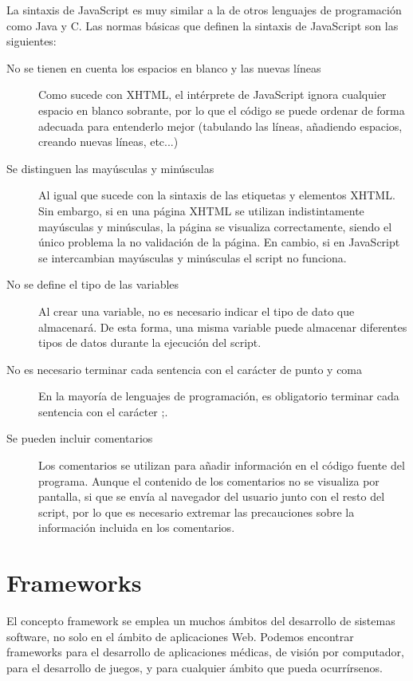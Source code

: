 La sintaxis de JavaScript es muy similar a la de otros lenguajes de programación como Java y C. Las normas básicas que definen la sintaxis de JavaScript son las siguientes:
\begin{description}
    \item[No se tienen en cuenta los espacios en blanco y las nuevas líneas] Como sucede con XHTML, el intérprete de JavaScript ignora cualquier espacio en blanco sobrante, por lo que el código se puede ordenar de forma adecuada para entenderlo mejor (tabulando las líneas, añadiendo espacios, creando nuevas líneas, etc...)
    
    \item[Se distinguen las mayúsculas y minúsculas] Al igual que sucede con la sintaxis de las etiquetas y elementos XHTML. Sin embargo, si en una página XHTML se utilizan indistintamente mayúsculas y minúsculas, la página se visualiza correctamente, siendo el único problema la no validación de la página. En cambio, si en JavaScript se intercambian mayúsculas y minúsculas el script no funciona.
    
    \item[No se define el tipo de las variables] Al crear una variable, no es necesario indicar el tipo de dato que almacenará. De esta forma, una misma variable puede almacenar diferentes tipos de datos durante la ejecución del script.
    
    \item[No es necesario terminar cada sentencia con el carácter de punto y coma] En la mayoría de lenguajes de programación, es obligatorio terminar cada sentencia con el carácter ;. 
        
    \item[Se pueden incluir comentarios] Los comentarios se utilizan para añadir información en el código fuente del programa. Aunque el contenido de los comentarios no se visualiza por pantalla, si que se envía al navegador del usuario junto con el resto del script, por lo que es necesario extremar las precauciones sobre la información incluida en los comentarios.
\end{description}

\section{Frameworks}

El concepto framework se emplea un muchos ámbitos del desarrollo de sistemas software, no solo en el ámbito de aplicaciones Web. Podemos encontrar frameworks para el desarrollo de aplicaciones médicas, de visión por computador, para el desarrollo de juegos, y para cualquier ámbito que pueda ocurrírsenos.

